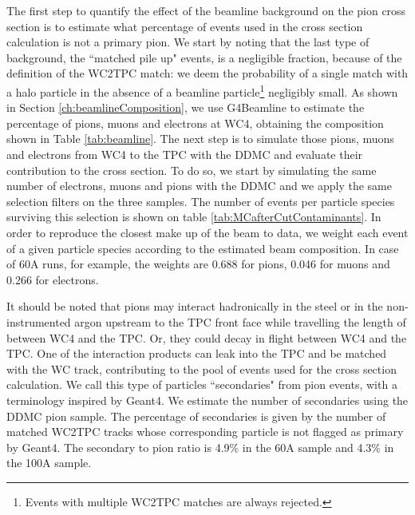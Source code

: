 The first step to quantify the effect of the beamline background on the pion cross section is to estimate what percentage of events used in the cross section calculation is not a primary pion.  We start by noting that the last type of background, the ``matched pile up" events, is a negligible fraction, because of the definition of the WC2TPC match: we deem the probability of a single match with a halo particle in the absence of a beamline particle\footnote{ Events with multiple WC2TPC matches are always rejected.} negligibly small. %
As shown in Section \ref{ch:beamlineComposition}, we use G4Beamline to estimate the percentage of pions, muons and electrons at WC4, obtaining the composition shown in Table \ref{tab:beamline}. The next step is to simulate those pions, muons and electrons from WC4 to the TPC with the DDMC and evaluate their contribution to the cross section. To do so, we start by simulating the same number of electrons, muons and pions with the DDMC and we apply the same selection filters on the three samples. The number of events per particle species surviving this selection is shown on table \ref{tab:MCafterCutContaminants}. In order to reproduce the closest make up of the beam to data, we weight each event of a given particle species according to the estimated beam composition. In case of 60A runs, for example, the weights are 0.688 for pions,  0.046 for muons  and 0.266 for electrons.


It should be noted that pions may  interact hadronically in the steel or in the non-instrumented argon upstream to the TPC front face while travelling the length of between WC4 and the TPC. Or, they could decay in flight between WC4 and the TPC. One of the interaction products can leak into the TPC and be matched with the WC track, contributing to the pool of events used for the cross section calculation. We call this type of particles ``secondaries" from pion events, with a terminology inspired by Geant4.  We estimate the number of secondaries using the DDMC pion sample.  The percentage of secondaries is given by the number of matched WC2TPC tracks whose corresponding particle is not flagged as primary by Geant4.  The secondary to pion ratio is 4.9\% in the 60A sample and 4.3\% in the 100A sample.





